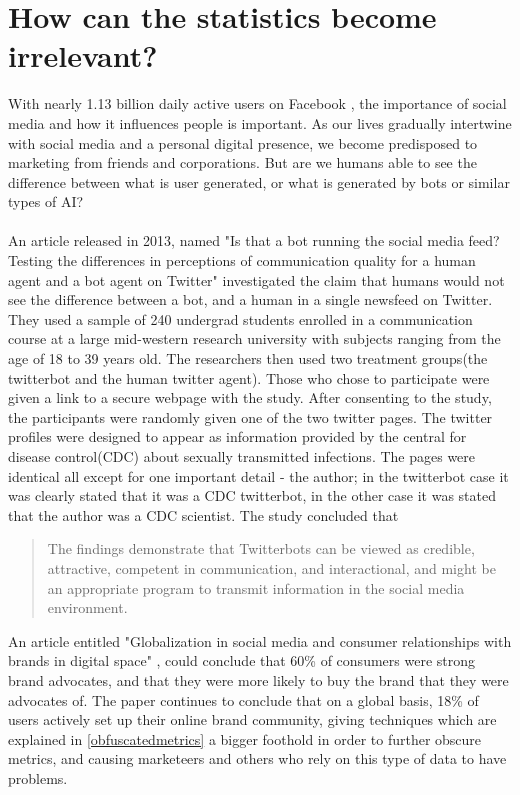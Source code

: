 \section{How can the statistics become irrelevant?}\label{botrunningfeed}
With nearly 1.13 billion daily active users on Facebook \cite{FB:stats}, the importance of social media and how it influences people is important. As our lives gradually intertwine with social media and a personal digital presence, we become predisposed to marketing from friends and corporations.  But are we humans able to see the difference between what is user generated, or what is generated by bots or similar types of AI?
\\
\\
An article released in 2013, named "Is that a bot running the social media feed? Testing the differences in perceptions of communication quality for a human agent and a bot agent on Twitter"\cite{Edwards2014372} investigated the claim that humans would not see the difference between a bot, and a human in a single newsfeed on Twitter. They used a sample of 240 undergrad students enrolled in a communication course at a large mid-western research university with subjects ranging from the age of 18 to 39 years old. The researchers then used two treatment groups(the twitterbot and the human twitter agent). Those who chose to participate were given a link to a secure webpage with the study. After consenting to the study, the participants were randomly given one of the two twitter pages. The twitter profiles were designed to appear as information provided by the central for disease control(CDC) about sexually transmitted infections. The pages were identical all except for one important detail - the author; in the twitterbot case it was clearly stated that it was a CDC twitterbot, in the other case it was stated that the author was a CDC scientist. The study concluded that
 \begin{quote}
The findings demonstrate that Twitterbots can be viewed as credible, attractive,
competent in communication, and interactional, and might be an
appropriate program to transmit information in the social media
environment. 
\newline \mbox{} \hfill \cite{Edwards2014372}

\end{quote}
An article entitled "Globalization in social media and consumer relationships with brands in digital space" \cite{6959277120111201}, could conclude that 60\% of consumers\cite{6959277120111201} were strong brand advocates, and that they were more likely to buy the brand that they were advocates of. The paper continues to conclude that on a global basis, 18\% of users actively set up their online brand community\cite{6959277120111201}, giving techniques which are explained in \ref{obfuscatedmetrics} a bigger foothold in order to further obscure metrics, and causing marketeers and others who rely on this type of data to have problems.
\newpage
